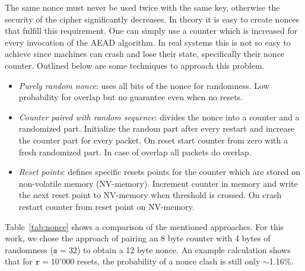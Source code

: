 
The same nonce must never be used twice with the same key, otherwise the security of the
cipher significantly decreases. In theory it is easy to create nonces that fulfill this
requirement. One can simply use a counter which is increased for every invocation of the
AEAD algorithm. In real systems this is not so easy to achieve since machines can crash
and lose their state, specifically their nonce counter. Outlined below are some techniques
to approach this problem.

\begin{itemize}
	\item \textit{Purely random nonce}: uses all bits of the nonce for randomness. Low
	      probability for overlap but no guarantee even when no resets.
	\item \textit{Counter paired with random sequence}: divides the nonce into a counter
	      and a randomized part. Initialize the random part after every restart and increase
	      the counter part for every packet. On reset start counter from zero with a fresh
	      randomized part. In case of overlap all packets do overlap.
	\item \textit{Reset points}: defines specific resets points for the counter which are
	      stored on non-volatile memory (NV-memory). Increment counter in memory and write the
	      next reset point to NV-memory when threshold is crossed. On crash restart counter from
	      reset point on NV-memory.
\end{itemize}

Table~\ref{tab:nonce} shows a comparison of the mentioned approaches. For this work, we chose the
approach of pairing an 8 byte counter with 4 bytes of randomness ($\texttt{s} = 32$) to obtain a 12
byte nonce. An example calculation shows that for $\texttt{r} = 10'000$ resets, the probability of
a nonce clash is still only $\sim$1.16\%.


